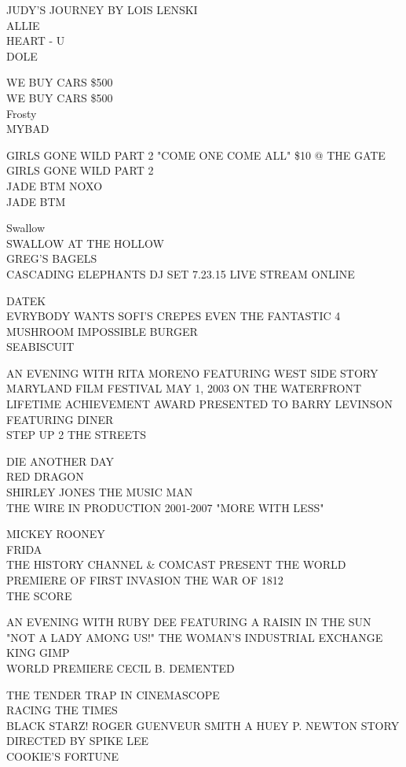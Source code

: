 \documentclass[10pt,letterpaper]{article}
\begin{document}
JUDY'S JOURNEY BY LOIS LENSKI\\
ALLIE\\
HEART {-} U\\
DOLE

WE BUY CARS \$500\\
WE BUY CARS \$500\\
Frosty\\
MYBAD

GIRLS GONE WILD PART 2 "COME ONE COME ALL" \$10 @ THE GATE\\
GIRLS GONE WILD PART 2\\
JADE BTM NOXO\\
JADE BTM

Swallow\\
SWALLOW AT THE HOLLOW\\
GREG'S BAGELS\\
CASCADING ELEPHANTS DJ SET 7.23.15 LIVE STREAM ONLINE

DATEK\\
EVRYBODY WANTS SOFI'S CREPES EVEN THE FANTASTIC 4\\
MUSHROOM IMPOSSIBLE BURGER\\
SEABISCUIT

AN EVENING WITH RITA MORENO FEATURING WEST SIDE STORY\\
MARYLAND FILM FESTIVAL MAY 1, 2003 ON THE WATERFRONT\\
LIFETIME ACHIEVEMENT AWARD PRESENTED TO BARRY LEVINSON FEATURING DINER\\
STEP UP 2 THE STREETS

DIE ANOTHER DAY\\
RED DRAGON\\
SHIRLEY JONES THE MUSIC MAN\\
THE WIRE IN PRODUCTION 2001{-}2007 "MORE WITH LESS"

MICKEY ROONEY\\
FRIDA\\
THE HISTORY CHANNEL \& COMCAST PRESENT THE WORLD PREMIERE OF FIRST INVASION THE WAR OF 1812\\
THE SCORE

AN EVENING WITH RUBY DEE FEATURING A RAISIN IN THE SUN\\
"NOT A LADY AMONG US!" THE WOMAN'S INDUSTRIAL EXCHANGE\\
KING GIMP\\
WORLD PREMIERE CECIL B. DEMENTED

THE TENDER TRAP IN CINEMASCOPE\\
RACING THE TIMES\\
BLACK STARZ!  ROGER GUENVEUR SMITH A HUEY P. NEWTON STORY DIRECTED BY SPIKE LEE\\
COOKIE'S FORTUNE
\end{document}
